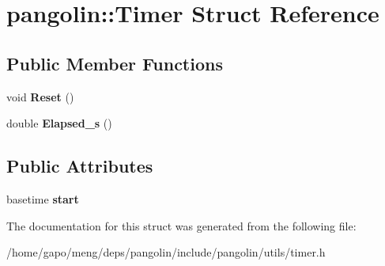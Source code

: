 \hypertarget{structpangolin_1_1_timer}{}\section{pangolin\+:\+:Timer Struct Reference}
\label{structpangolin_1_1_timer}
\subsection*{Public Member Functions}
\begin{DoxyCompactItemize}
\item 
void {\bfseries Reset} ()\hypertarget{structpangolin_1_1_timer_aaf0b01ec01f44c5da0241625beb71123}{}\label{structpangolin_1_1_timer_aaf0b01ec01f44c5da0241625beb71123}

\item 
double {\bfseries Elapsed\+\_\+s} ()\hypertarget{structpangolin_1_1_timer_a6eb771a3f219d6ec5239a9bee8a41bca}{}\label{structpangolin_1_1_timer_a6eb771a3f219d6ec5239a9bee8a41bca}

\end{DoxyCompactItemize}
\subsection*{Public Attributes}
\begin{DoxyCompactItemize}
\item 
basetime {\bfseries start}\hypertarget{structpangolin_1_1_timer_aa85a5e1e1804896d257c9dc0f97bdd15}{}\label{structpangolin_1_1_timer_aa85a5e1e1804896d257c9dc0f97bdd15}

\end{DoxyCompactItemize}


The documentation for this struct was generated from the following file\+:\begin{DoxyCompactItemize}
\item 
/home/gapo/meng/deps/pangolin/include/pangolin/utils/timer.\+h\end{DoxyCompactItemize}
